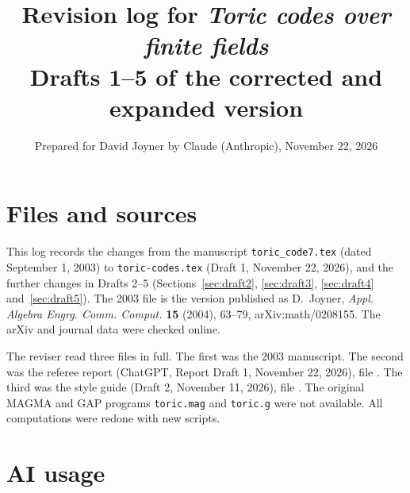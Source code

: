 \documentclass[12pt,letterpaper]{article}
\title{Revision log for \emph{Toric codes over finite fields}\\[4pt]
\large Drafts 1--5 of the corrected and expanded version}
\author{Prepared for David Joyner by Claude (Anthropic), November 22, 2026}
\date{}
\begin{document}
\maketitle

\section{Files and sources}

This log records the changes from the manuscript \texttt{toric\_code7.tex}
(dated September 1, 2003) to \texttt{toric-codes.tex} (Draft 1, November
22, 2026), and the further changes in Drafts 2--5
(Sections~\ref{sec:draft2}, \ref{sec:draft3}, \ref{sec:draft4}
and~\ref{sec:draft5}). The 2003 file is the version published as D.~Joyner, \emph{Appl.
Algebra Engrg. Comm. Comput.} \textbf{15} (2004), 63--79, arXiv:math/0208155.
The arXiv and journal data were checked online.

The reviser read three files in full. The first was the 2003 manuscript.
The second was the referee report (ChatGPT, Report Draft 1, November 22,
2026), file . The third was the style
guide (Draft 2, November 11, 2026), file
. The
original MAGMA and GAP programs \texttt{toric.mag} and \texttt{toric.g} were not
available. All computations were redone with new scripts.

\section{AI usage}
\end{document}
